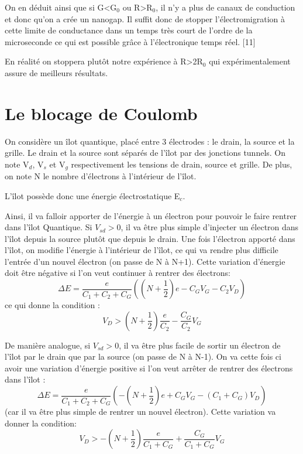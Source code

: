 On en déduit ainsi que si G<G${_0}$ ou R>R${_0}$, il n'y a plus de canaux de conduction et donc qu'on a crée un nanogap. Il suffit donc de stopper l'électromigration à cette limite de conductance dans un temps très court de l'ordre de la microseconde ce qui est possible grâce à l'électronique temps réel. [11]

En réalité on stoppera plutôt notre expérience à R>2R${_0}$ qui expérimentalement assure de meilleurs résultats.

\section{Le blocage de Coulomb}
On considère un îlot quantique, placé entre 3 électrodes : le drain, la source et la grille. Le drain et la source sont séparés de l'îlot par des jonctions tunnels. On note V${_d}$, V${_s}$ et V${_g}$ respectivement les tensions de drain, source et grille. De plus, on note N le nombre d'électrons à l'intérieur de l'îlot. 
\begin{figure}[h]
    \begin{center}
        \caption{}
        \label{fig:}
    \end{center}
\end{figure}

L'îlot possède donc une énergie électrostatique E${_c}$.

Ainsi, il va falloir apporter de l'énergie à un électron pour pouvoir le faire rentrer dans l'îlot Quantique. Si $V_{sd}>0$, il va être plus simple  d'injecter un électron dans l'îlot depuis la source plutôt que depuis le drain. Une fois l'électron apporté dans l'îlot, on modifie l'énergie à l'intérieur de l'îlot, ce qui va rendre plus difficile l'entrée d'un nouvel électron (on passe de N à N+1). Cette variation d'énergie doit être négative si l'on veut continuer à rentrer des électrons:
\[\Delta E = \frac{e}{C_1 + C_2 + C_G}\left((N + \frac{1}{2})e - C_G V_G - C_2 V_D\right)\]
ce qui donne la condition :
\[V_D > (N + \frac{1}{2})\frac{e}{C_2} - \frac{C_G}{C_2}V_G\]

De manière analogue, si $V_{sd}>0$, il va être plus facile de sortir un électron de l'îlot par le drain que par la source (on passe de N à N-1). On va cette fois ci avoir une variation d'énergie positive si l'on veut arrêter de rentrer des électrons dans l'îlot :
\[\Delta E = \frac{e}{C_1 + C_2 + C_G}\left(-(N + \frac{1}{2})e + C_G V_G - (C_1 + C_G) V_D\right)\]
(car il va être plus simple de rentrer un nouvel électron). Cette variation va donner la condition:
\[V_D > - (N + \frac{1}{2})\frac{e}{C_1 + C_G} + \frac{C_G}{C_1 + C_G}V_G\]

